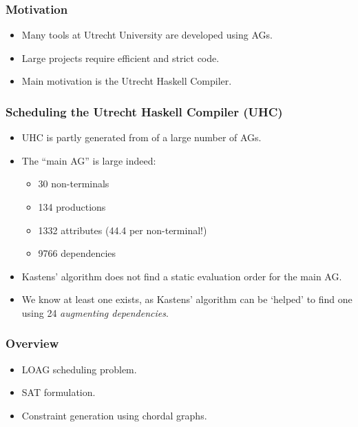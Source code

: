 \documentclass{beamer}
\begin{document}
\begin{frame}
    \frametitle{Motivation}
    \begin{itemize}
        \item Many tools at Utrecht University are developed using AGs.
        \item Large projects require efficient and strict code.
        \item Main motivation is the Utrecht Haskell Compiler.         
    \end{itemize}
\end{frame}

\begin{frame}
    \frametitle{Scheduling the Utrecht Haskell Compiler (UHC)}
    \begin{itemize}
        \item UHC is partly generated from of a large number of AGs.
        \item The ``main AG'' is large indeed:
         \begin{itemize}
            \item 30 non-terminals
            \item 134 productions
            \item 1332 attributes (44.4 per non-terminal!)
            \item 9766 dependencies
         \end{itemize} 
        \item Kastens' algorithm does not find a static evaluation order for the main AG.
        \item We know at least one exists, as Kastens' algorithm can be `helped' to find one
                using 24 \emph{augmenting dependencies}.
    \end{itemize}
\end{frame}

\begin{frame}
    \frametitle{Overview}
    \begin{itemize}
        \item LOAG scheduling problem.
        \item SAT formulation.
        \item Constraint generation using chordal graphs.
    \end{itemize}
\end{frame}
\end{document}
